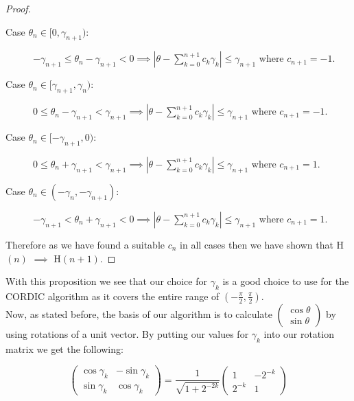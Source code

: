 {\begin{proof}
\begin{description}
\begin{description}
	\item[Case \(\theta_n \in [0, \gamma_{n+1})\):]\hfill\break
		\(-\gamma_{n+1} \le \theta_n - \gamma_{n+1} < 0 \implies |\theta - \sum_{k=0}^{n+1}c_k\gamma_k| \le \gamma_{n+1}\) where \(c_{n+1} = -1\).
	\item[Case \(\theta_n \in [\gamma_{n+1}, \gamma_n)\):]\hfill\break
		\(0 \le \theta_n - \gamma_{n+1} < \gamma_{n+1} \implies |\theta - \sum_{k=0}^{n+1}c_k\gamma_k| \le \gamma_{n+1}\) where \(c_{n+1} = -1\).
	\item[Case \(\theta_n \in [-\gamma_{n+1}, 0)\):]\hfill\break
		\(0 \le \theta_n + \gamma_{n+1} < \gamma_{n+1} \implies |\theta - \sum_{k=0}^{n+1}c_k\gamma_k| \le \gamma_{n+1}\) where \(c_{n+1} = 1\).
	\item[Case \(\theta_n \in (-\gamma_n, -\gamma_{n+1})\):]\hfill\break
		\(-\gamma_{n+1} < \theta_n + \gamma_{n+1} < 0 \implies |\theta - \sum_{k=0}^{n+1}c_k\gamma_k| \le \gamma_{n+1}\) where \(c_{n+1} = 1\).
	\end{description}
\end{description}
	Therefore as we have found a suitable \(c_n\) in all cases then we have shown that \textrm{H\((n)\) \(\implies\) H\((n+1)\)}.
\end{proof}

With this proposition we see that our choice for \(\gamma_k\) is a good choice to use for the CORDIC algorithm as it covers the entire range of \((-\frac{\pi}{2}, \frac{\pi}{2})\).\\

Now, as stated before, the basis of our algorithm is to calculate \(\left(\begin{array}{c}\cos\theta\\\sin\theta\end{array}\right)\) by using rotations of a unit vector. By putting our values for \(\gamma_k\) into our rotation matrix we get the following:

\begin{displaymath}
\left(\begin{array}{cc}
	\cos\gamma_k & -\sin\gamma_k\\
	\sin\gamma_k & \cos\gamma_k
	\end{array}\right)
= \frac{1}{\sqrt{1 + 2^{-2k}}}
\left(\begin{array}{cc}
	1 & -2^{-k}\\
	2^{-k} & 1
\end{array}\right)
\end{displaymath}

}
